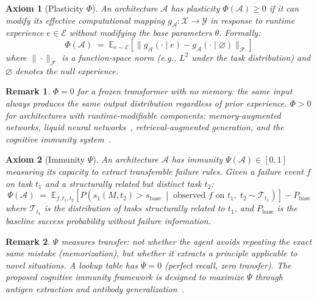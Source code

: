 \documentclass{article}
\newtheorem{axiom}{Axiom}
\newtheorem{remark}{Remark}
\newcommand{\cA}{\mathcal{A}}
\newcommand{\cT}{\mathcal{T}}
\newcommand{\cE}{\mathcal{E}}
\newcommand{\E}{\mathbb{E}}
\begin{document}
\begin{axiom}[Plasticity $\Phi$]
\label{ax:plasticity}
An architecture $\cA$ has \emph{plasticity} $\Phi(\cA) \geq 0$ if it can modify its effective computational mapping $g_\cA: \mathcal{X} \to \mathcal{Y}$ in response to runtime experience $e \in \cE$ without modifying the base parameters $\theta$.
Formally:
\begin{equation}
    \Phi(\cA) \;=\; \E_{e \sim \cE}\left[\|g_{\cA}(\cdot \mid e) - g_{\cA}(\cdot \mid \varnothing)\|_{\mathcal{F}}\right]
\end{equation}
where $\|\cdot\|_{\mathcal{F}}$ is a function-space norm (e.g., $L^2$ under the task distribution) and $\varnothing$ denotes the null experience.
\end{axiom}

\begin{remark}
$\Phi = 0$ for a frozen transformer with no memory: the same input always produces the same output distribution regardless of prior experience.
$\Phi > 0$ for architectures with runtime-modifiable components: memory-augmented networks, liquid neural networks~\citep{hasani2021liquid}, retrieval-augmented generation, and the cognitive immunity system~\citep{anon2026p1}.
\end{remark}

\begin{axiom}[Immunity $\Psi$]
\label{ax:immunity}
An architecture $\cA$ has \emph{immunity} $\Psi(\cA) \in [0, 1]$ measuring its capacity to extract transferable failure rules.
Given a failure event $f$ on task $t_1$ and a structurally related but distinct task $t_2$:
\begin{equation}
    \Psi(\cA) \;=\; \E_{f, t_1, t_2}\left[P\!\left(s_1(M, t_2) > s_{\text{base}} \;\middle|\; \text{observed } f \text{ on } t_1,\; t_2 \sim \cT_{t_1}\right)\right] - P_{\text{base}}
\end{equation}
where $\cT_{t_1}$ is the distribution of tasks structurally related to $t_1$, and $P_{\text{base}}$ is the baseline success probability without failure information.
\end{axiom}

\begin{remark}
$\Psi$ measures \emph{transfer}: not whether the agent avoids repeating the exact same mistake (memorization), but whether it extracts a \emph{principle} applicable to novel situations.
A lookup table has $\Psi = 0$ (perfect recall, zero transfer).
The proposed cognitive immunity framework is designed to maximize $\Psi$ through antigen extraction and antibody generalization~\citep{anon2026p1}.
\end{remark}
\end{document}
